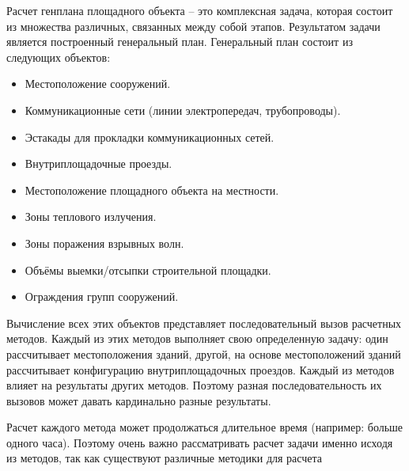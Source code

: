 Расчет генплана площадного объекта -- это комплексная задача, которая состоит из множества различных,
связанных между собой этапов. Результатом задачи является построенный генеральный план.
Генеральный план состоит из следующих объектов:
\begin{itemize}
	\item Местоположение сооружений.
	\item Коммуникационные сети (линии электропередач, трубопроводы).
	\item Эстакады для прокладки коммуникационных сетей.
	\item Внутриплощадочные проезды.
	\item Местоположение площадного объекта на местности.
	\item Зоны теплового излучения.
	\item Зоны поражения взрывных волн.
	\item Объёмы выемки/отсыпки строительной площадки.
	\item Ограждения групп сооружений.
\end{itemize}

Вычисление всех этих объектов представляет последовательный вызов расчетных методов.
Каждый из этих методов выполняет свою определенную задачу: один рассчитывает местоположения зданий, другой, на основе
местоположений зданий рассчитывает конфигурацию внутриплощадочных проездов. Каждый из методов влияет на
результаты других методов. Поэтому разная последовательность их вызовов может давать кардинально разные результаты.

Расчет каждого метода может продолжаться длительное время (например: больше одного часа). Поэтому очень важно
рассматривать расчет задачи именно исходя из методов, так как существуют различные методики для расчета



